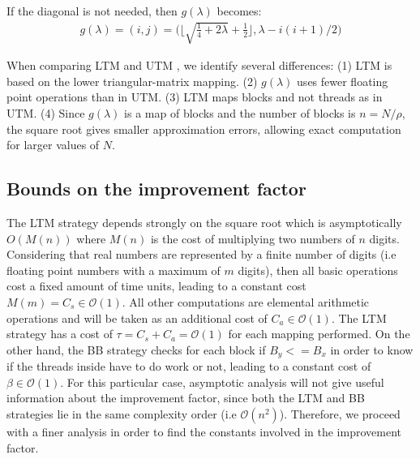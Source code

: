 \documentclass[conference]{IEEEtran}
\begin{document}
If the diagonal is not needed, then $g(\lambda)$ becomes:
\begin{align}
g(\lambda) = (i,j) = \Big(\Big\lfloor\sqrt{\frac{1}{4} + 2\lambda} + \frac{1}{2}\Big\rfloor, \lambda - i(i+1)/2\Big)
\label{eq_theorem_nodiag}
\end{align}

When comparing LTM and UTM \cite{AvrilGA12}, we identify several differences: (1) LTM is based on the lower triangular-matrix mapping. (2) $g(\lambda)$ uses fewer floating point operations than in UTM. 
(3) LTM maps blocks and not threads as in UTM. (4) Since $g(\lambda)$ is a map of blocks and the number of blocks is $n = N/\rho$, the square root gives smaller approximation errors, allowing 
exact computation for larger values of $N$. 

\subsection{Bounds on the improvement factor}
The LTM strategy depends strongly on the square root which is asymptotically $O(M(n))$ \cite{Ypma:1995:HDN:222504.222510} where $M(n)$ is the cost of multiplying 
two numbers of $n$ digits. 
Considering that real numbers are represented by a finite number of digits 
(i.e floating point numbers with a maximum of $m$ digits), then all basic operations cost a fixed amount of
time units, leading to a constant cost $M(m) = C_s \in \mathcal{O}(1)$. All other computations are elemental arithmetic operations and 
will be taken as an additional cost of $C_a \in \mathcal{O}(1)$. The LTM strategy has a cost of 
$\tau = C_s + C_a = \mathcal{O}(1)$ for each mapping performed. 
On the other hand, the BB strategy checks for each block if $B_y <= B_x$ in order 
to know if the threads inside have to do work or not, leading to a constant cost of $\beta \in \mathcal{O}(1)$. 
For this particular case, asymptotic analysis will not give useful information about the improvement factor, since both the 
LTM and BB strategies lie in the same complexity order (i.e $\mathcal{O}(n^2)$). Therefore, 
we proceed with a finer analysis in order to find the constants involved in the improvement factor.
\end{document}
